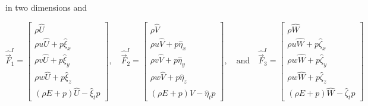 in two dimensions and

\[ \hat{\vec{F}}^I_1 = \begin{bmatrix} \rho \hat{U} \\ \rho u \hat{U} + p\hat{\xi}_x \\ \rho v \hat{U} + p \hat{\xi}_y \\ \rho w \hat{U} + p\hat{\xi}_z \\ (\rho E + p)\hat{U} - \hat{\xi}_t p \end{bmatrix}, \quad \hat{\vec{F}}^I_2 = \begin{bmatrix} \rho \hat{V} \\ \rho u \hat{V} + p\hat{\eta}_x \\ \rho v \hat{V} + p \hat{\eta}_y \\ \rho w \hat{V} + p \hat{\eta}_z \\ (\rho E + p)\hat{V} - \hat{\eta}_t p \end{bmatrix}, \quad \mbox{and} \quad \hat{\vec{F}}^I_3 = \begin{bmatrix} \rho \hat{W} \\ \rho u \hat{W} + p\hat{\zeta}_x \\ \rho w \hat{W} + p \hat{\zeta}_y \\ \rho w \hat{W} + p \hat{\zeta}_z \\ (\rho E + p)\hat{W} - \hat{\zeta}_t p \end{bmatrix} \]

